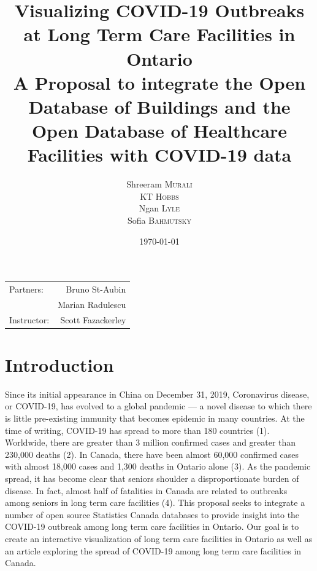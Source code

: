 \documentclass{article}
\title{Visualizing COVID-19 Outbreaks at Long Term Care Facilities in Ontario \\ 
		\large A Proposal to integrate the Open Database of Buildings and the Open Database of Healthcare Facilities with COVID-19 data}
\author{Shreeram \textsc{Murali} \\ KT \textsc{Hobbs} \\ Ngan \textsc{Lyle} \\ Sofia \textsc{Bahmutsky}}
\date{\today} %
\begin{document}
\maketitle %

\begin{center}
\begin{tabular}{l r}
Partners: & Bruno St-Aubin \\ %
& Marian Radulescu \\
Instructor: & Scott Fazackerley %
\end{tabular}
\end{center}



\section{Introduction}

Since its initial appearance in China on December 31, 2019, Coronavirus disease, or COVID-19, has evolved to a global pandemic --- a novel disease to which there is little pre-existing immunity that becomes epidemic in many countries. At the time of writing, COVID-19 has spread to more than 180 countries (1). Worldwide, there are greater than 3 million confirmed cases and greater than 230,000 deaths (2). In Canada, there have been almost 60,000 confirmed cases with almost 18,000 cases and 1,300 deaths in Ontario alone (3). As the pandemic spread, it has become clear that seniors shoulder a disproportionate burden of disease. In fact, almost half of fatalities in Canada are related to outbreaks among seniors in long term care facilities (4). This proposal seeks to integrate a number of open source Statistics Canada databases to provide insight into the COVID-19 outbreak among long term care facilities in Ontario. Our goal is to create an interactive visualization of long term care facilities in Ontario as well as an article exploring the spread of COVID-19 among long term care facilities in Canada. 
\end{document}
